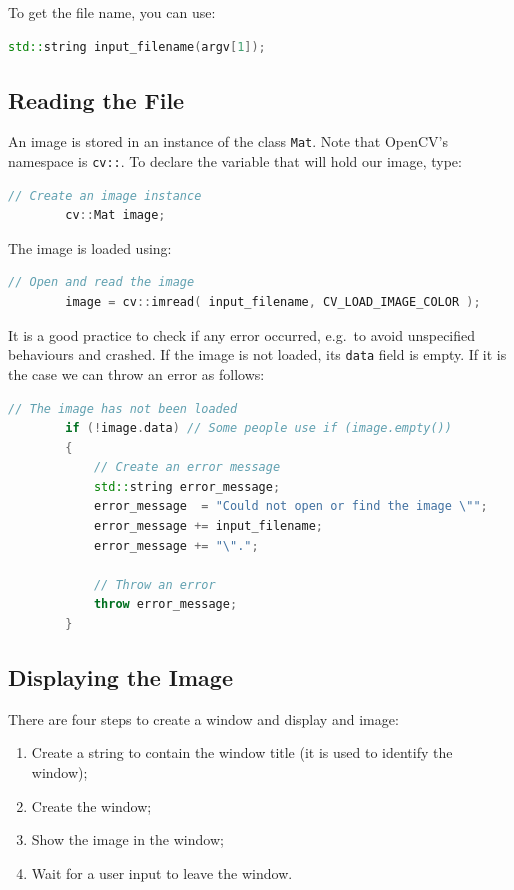\documentclass[english,a4paper,12pt,oneside]{article}
\begin{document}
To get the file name, you can use:
\begin{lstlisting}[language=c++,caption=Getting the file name from the command line arguments.]
std::string input_filename(argv[1]);
\end{lstlisting}

\subsection{Reading the File}

An image is stored in an instance of the class  \verb+Mat+. 
Note that OpenCV's namespace is \verb+cv::+. 
To declare the variable that will hold our image, type:
 \begin{lstlisting}[language=c++]
        // Create an image instance
        cv::Mat image;
\end{lstlisting}

The image is loaded using:
 \begin{lstlisting}[language=c++,caption=Open an image.]
        // Open and read the image
        image = cv::imread( input_filename, CV_LOAD_IMAGE_COLOR );
\end{lstlisting}

It is a good practice to check if any error occurred, e.g.~to avoid unspecified behaviours and crashed. 
If the image is not loaded, its \verb+data+ field is empty. 
If it is the case we can throw an error as follows:
 \begin{lstlisting}[language=c++,caption=Check that the image contains data]
        // The image has not been loaded
        if (!image.data) // Some people use if (image.empty())
        {
            // Create an error message
            std::string error_message;
            error_message  = "Could not open or find the image \"";
            error_message += input_filename;
            error_message += "\".";

            // Throw an error
            throw error_message;
        }
\end{lstlisting}


\subsection{Displaying the Image}

There are four steps to create a window and display and image:
\begin{enumerate}
 \item Create a string to contain the window title (it is used to identify the window);
 \item Create the window;
 \item Show the image in the window;
 \item Wait for a user input to leave the window.
\end{enumerate}
\end{document}
